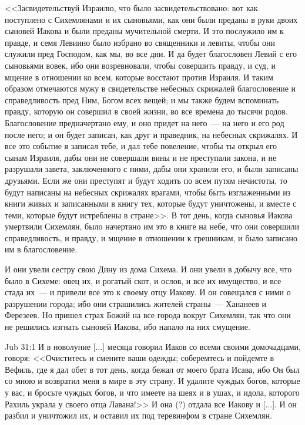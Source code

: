 <<Засвидетельствуй Израилю, что было
засвидетельствовано: вот как поступлено с
Сихемлянами и их сыновьями, как они были преданы
в руки двоих сыновей Иакова и были преданы
мучительной смерти. И это послужило им к правде, и
семя Левиино было избрано во священники и левиты,
чтобы они служили пред Господом, как мы, во все
дни. И да будет благословен Левий с его сыновьями
вовек, ибо они возревновали, чтобы совершить
правду, и суд, и мщение в отношении ко всем,
которые восстают против Израиля. И таким образом
отмечаются мужу в свидетельстве небесных
скрижалей благословение и справедливость пред
Ним, Богом всех вещей; и мы также будем вспоминать
правду, которую он совершил в своей жизни, во все
времена до тысячи родов. Благословение
предначертано ему, и оно придет на него~--- на него и
его род после него; и он будет записан, как друг и
праведник, на небесных скрижалях. И все это
событие я записал тебе, и дал тебе повеление,
чтобы ты открыл его сынам Израиля, дабы они не
совершали вины и не преступали закона, и не
разрушали завета, заключенного с ними, дабы они
хранили его, и были записаны друзьями. Если же они
преступят и будут ходить по всем путям нечистоты,
то будут написаны на небесных скрижалях врагами,
чтобы быть изглаженными из книги живых и
записанными в книгу тех, которые будут
уничтожены, и вместе с теми, которые будут
истреблены в стране>>. В тот день, когда сыновья
Иакова умертвили Сихемлян, было начертано им это
в книге на небе, что они совершили
справедливость, и правду, и мщение в отношении к
грешникам, и было записано им в благословение.

И они увели сестру свою Дину из дома Сихема. И
они увели в добычу все, что было в Сихеме: овец их,
и рогатый скот, и ослов, и все их имущество, и все
стада их~--- и привели все это к своему отцу Иакову.
И он совещался с ними о разрушении города; ибо они
страшились жителей страны~--- Хананеев и Ферезеев.
Но пришел страх Божий на все города вокруг
Сихемлян, так что они не решились изгнать сыновей
Иакова, ибо напало на них смущение.

\vs Jub 31:1
И в новолуние [...] месяца говорил Иаков со всеми
своими домочадцами, говоря: <<Очиститесь и
смените ваши одежды; соберемтесь и пойдемте в
Вефиль, где я дал обет в тот день, когда бежал от
моего брата Исава, ибо Он был со мною и возвратил
меня в мире в эту страну. И удалите чуждых богов,
которые у вас, и бросьте чуждых богов, и что
имеете на шеях и в ушах, и идола, которого Рахиль
украла у своего отца Лавана!>> И она (?) отдала
все Иакову и [...]. И он разбил и уничтожил их, и
оставил их под теревинфом в стране Сихемлян.

